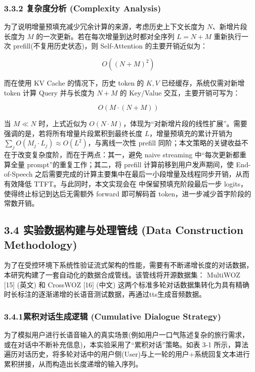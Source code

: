 \documentclass[UTF8,a4paper,12pt]{ctexart}
\begin{document}
\subsubsection*{3.3.2 复杂度分析 (Complexity Analysis)}


为了说明增量预填充减少冗余计算的来源，考虑历史上下文长度为 $N$、新增片段长度为 $M$ 的一次更新。若在每次增量到达时都对全序列 $L=N+M$ 重新执行一次 prefill(不复用历史状态)，则 Self-Attention 的主要开销近似为：

\[
O((N+M)^2)
\]


而在使用 KV Cache 的情况下，历史 token 的 $K,V$ 已经缓存，系统仅需对新增 token 计算 Query 并与长度为 $N+M$ 的 Key/Value 交互，主要开销可写为：

\[
O(M\cdot(N+M))
\]


当 $M\ll N$ 时，上式近似为 $O(N\cdot M)$，体现为“对新增片段的线性扩展”。需要强调的是，若将所有增量片段累积到最终长度 $L$，增量预填充的累计开销为 $\sum_j O(M_j\cdot L_j)\approx O(L^2)$，与离线一次性 prefill 同阶；本文策略的关键收益不在于改变复杂度阶，而在于两点：其一，避免 naive streaming 中“每次更新都重算全量 prompt”的重复工作；其二，将 prefill 计算前移到用户发声期间，使 End-of-Speech 之后需要完成的计算主要集中在最后一小段增量及线程同步开销，从而有效降低 TTFT。与此同时，本文实现会在 \texttt{} 中保留预填充阶段最后一步 logits，使得终止标记到达后无需额外 forward 即可解码首 token，进一步减少首字阶段的常数开销。

\subsection*{3.4 实验数据构建与处理管线 (Data Construction Methodology)}


为了在受控环境下系统性验证流式架构的性能，需要有不断递增长度的对话数据，本研究构建了一套自动化的数据合成管线。该管线将开源数据集： MultiWOZ [15] (英文) 和 CrossWOZ [16] (中文) 这两个标准多轮对话数据集转化为具有精确时长标注的逐渐递增的长语音测试数据，再通过tts生成音频数据。

\subsubsection*{3.4.1累积对话生成逻辑 (Cumulative Dialogue Strategy)}


为了模拟用户进行长语音输入的真实场景(例如用户一口气陈述复杂的旅行需求，或在对话中不断补充信息)，本实验采用了“累积对话”策略。如表 3-1 所示，算法遍历对话历史，将多轮对话中的用户侧(User)与上一轮的用户+系统回复文本进行累积拼接，从而构造出长度递增的输入序列。
\end{document}
